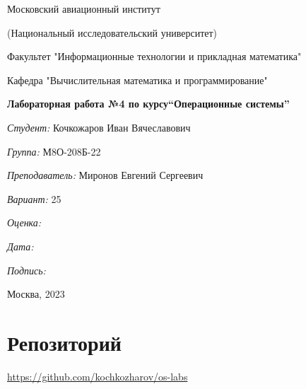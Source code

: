 \documentclass[a4paper, 12pt]{article}
\begin{document}
\thispagestyle{empty}
\begin{center}
    Московский авиационный институт

    (Национальный исследовательский университет)

    Факультет "Информационные технологии и прикладная математика"

    Кафедра "Вычислительная математика и программирование"

\end{center}
\vspace{40ex}
\begin{center}
    \textbf{\large{Лабораторная работа №4 по курсу\linebreak \textquotedblleft Операционные системы\textquotedblright}}
\end{center}
\vspace{35ex}
\begin{flushright}
    \textit{Студент: } Кочкожаров Иван Вячеславович

    \vspace{2ex}
    \textit{Группа: } М8О-208Б-22

    \vspace{2ex}
    \textit{Преподаватель: } Миронов Евгений Сергеевич

    \vspace{2ex}
    \textit{Вариант: } 25

    \vspace{2ex}
    \textit{Оценка: } \underline{\quad\quad\quad\quad\quad\quad}

    \vspace{2ex}
    \textit{Дата: } \underline{\quad\quad\quad\quad\quad\quad}

    \vspace{2ex}
    \textit{Подпись: } \underline{\quad\quad\quad\quad\quad\quad}

\end{flushright}

\vspace{5ex}

\begin{vfill}
    \begin{center}
        Москва, 2023
    \end{center}
\end{vfill}
\newpage

\begingroup
\color{black}
\tableofcontents\newpage
\endgroup

\section{Репозиторий}
\href{https://github.com/kochkozharov/os-labs}{https://github.com/kochkozharov/os-labs}
\end{document}
